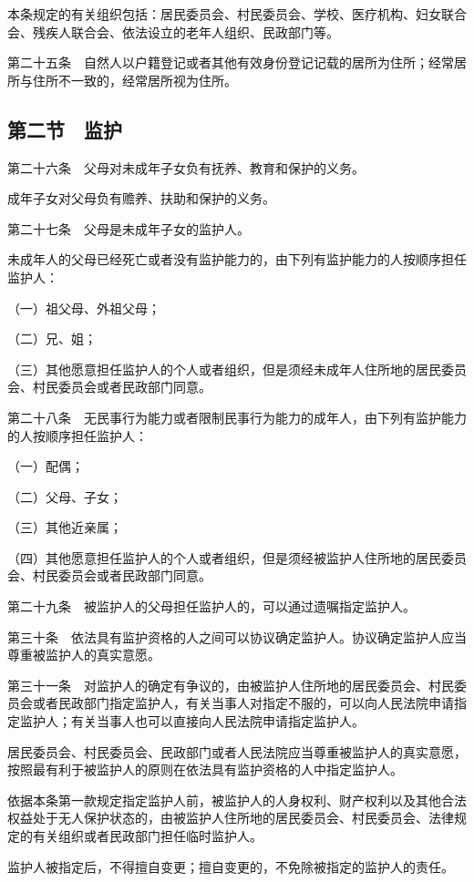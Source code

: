 \documentclass[UTF8,12pt,a4paper]{ctexbook}
\begin{document}
本条规定的有关组织包括：居民委员会、村民委员会、学校、医疗机构、妇女联合会、残疾人联合会、依法设立的老年人组织、民政部门等。

第二十五条　自然人以户籍登记或者其他有效身份登记记载的居所为住所；经常居所与住所不一致的，经常居所视为住所。

\subsection*{第二节　监护}

第二十六条　父母对未成年子女负有抚养、教育和保护的义务。

成年子女对父母负有赡养、扶助和保护的义务。

第二十七条　父母是未成年子女的监护人。

未成年人的父母已经死亡或者没有监护能力的，由下列有监护能力的人按顺序担任监护人：

（一）祖父母、外祖父母；

（二）兄、姐；

（三）其他愿意担任监护人的个人或者组织，但是须经未成年人住所地的居民委员会、村民委员会或者民政部门同意。

第二十八条　无民事行为能力或者限制民事行为能力的成年人，由下列有监护能力的人按顺序担任监护人：

（一）配偶；

（二）父母、子女；

（三）其他近亲属；

（四）其他愿意担任监护人的个人或者组织，但是须经被监护人住所地的居民委员会、村民委员会或者民政部门同意。

第二十九条　被监护人的父母担任监护人的，可以通过遗嘱指定监护人。

第三十条　依法具有监护资格的人之间可以协议确定监护人。协议确定监护人应当尊重被监护人的真实意愿。

第三十一条　对监护人的确定有争议的，由被监护人住所地的居民委员会、村民委员会或者民政部门指定监护人，有关当事人对指定不服的，可以向人民法院申请指定监护人；有关当事人也可以直接向人民法院申请指定监护人。

居民委员会、村民委员会、民政部门或者人民法院应当尊重被监护人的真实意愿，按照最有利于被监护人的原则在依法具有监护资格的人中指定监护人。

依据本条第一款规定指定监护人前，被监护人的人身权利、财产权利以及其他合法权益处于无人保护状态的，由被监护人住所地的居民委员会、村民委员会、法律规定的有关组织或者民政部门担任临时监护人。

监护人被指定后，不得擅自变更；擅自变更的，不免除被指定的监护人的责任。
\end{document}
